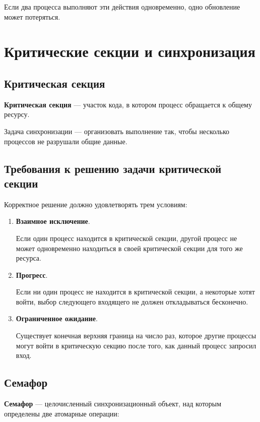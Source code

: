 \documentclass[12pt,a4paper]{article}
\begin{document}
Если два процесса выполняют эти действия одновременно, одно обновление может потеряться.

\section{Критические секции и синхронизация}

\subsection{Критическая секция}

\textbf{Критическая секция} --- участок кода, в котором процесс обращается к общему ресурсу.

Задача синхронизации --- организовать выполнение так, чтобы несколько процессов не разрушали общие данные.

\subsection{Требования к решению задачи критической секции}

Корректное решение должно удовлетворять трем условиям:

\begin{enumerate}
    \item \textbf{Взаимное исключение}.

    Если один процесс находится в критической секции, другой процесс не может одновременно находиться в своей критической секции для того же ресурса.

    \item \textbf{Прогресс}.

    Если ни один процесс не находится в критической секции, а некоторые хотят войти, выбор следующего входящего не должен откладываться бесконечно.

    \item \textbf{Ограниченное ожидание}.

    Существует конечная верхняя граница на число раз, которое другие процессы могут войти в критическую секцию после того, как данный процесс запросил вход.
\end{enumerate}

\subsection{Семафор}

\textbf{Семафор} --- целочисленный синхронизационный объект, над которым определены две атомарные операции:
\end{document}

